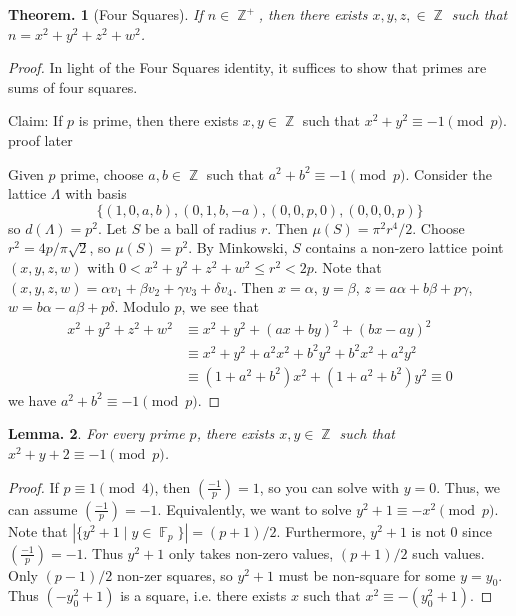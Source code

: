 \documentclass[11pt, a4paper]{memoir}
\DeclareMathOperator{\Z}{{\mathbb{Z}}}
\DeclareMathOperator{\F}{{\mathbb{F}}}
\theoremstyle{change}
\newtheorem{theorem}{Theorem.}[section]
\newtheorem{lemma}[theorem]{Lemma.}
\theoremstyle{plain}
\theoremstyle{nonumberplain}
\newtheorem{proof}{Proof}
\newcommand{\lgs}[2]{\ensuremath{\left(\frac{#1}{#2}\right)}}
\numberwithin{equation}{section}
\begin{document}
\begin{theorem}[Four Squares]
    If $n\in\Z^+$, then there exists $x,y,z,\in\Z$ such that $n=x^2+y^2+z^2+w^2$.
\end{theorem}
\begin{proof}
    In light of the Four Squares identity, it suffices to show that primes are sums of four squares.

    Claim: If $p$ is prime, then there exists $x,y\in\Z$ such that $x^2+y^2\equiv -1\pmod{p}$.
    proof later

    Given $p$ prime, choose $a,b\in\Z$ such that $a^2+b^2\equiv -1\pmod{p}$.
    Consider the lattice $\Lambda$ with basis
    \begin{equation*}
        \{(1,0,a,b),(0,1,b,-a),(0,0,p,0),(0,0,0,p)\}
    \end{equation*}
    so $d(\Lambda)=p^2$.
    Let $S$ be a ball of radius $r$.
    Then $\mu(S)=\pi^2r^4/2$.
    Choose $r^2=4p/\pi\sqrt{2}$, so $\mu(S)=p^2$.
    By Minkowski, $S$ contains a non-zero lattice point $(x,y,z,w)$ with $0<x^2+y^2+z^2+w^2\leq r^2<2p$.
    Note that $(x,y,z,w)=\alpha v_1+\beta v_2+\gamma v_3+\delta v_4$.
    Then $x=\alpha$, $y=\beta$, $z=a\alpha+b\beta+p\gamma$, $w=b\alpha-a\beta+p\delta$.
    Modulo $p$, we see that
    \begin{align*}
        x^2+y^2+z^2+w^2 &\equiv x^2+y^2+(ax+by)^2+(bx-ay)^2\\
                        &\equiv x^2+y^2+a^2x^2+b^2y^2+b^2x^2+a^2y^2\\
                        &\equiv (1+a^2+b^2)x^2+(1+a^2+b^2)y^2\equiv 0
    \end{align*}
    we have $a^2+b^2\equiv -1\pmod{p}$.
\end{proof}
\begin{lemma}
    For every prime $p$, there exists $x,y\in\Z$ such that $x^2+y+2\equiv -1\pmod{p}$.
\end{lemma}
\begin{proof}
    If $p\equiv 1\pmod{4}$, then $\lgs{-1}{p}=1$, so you can solve with $y=0$.
    Thus, we can assume $\lgs{-1}{p}=-1$.
    Equivalently, we want to solve $y^2+1\equiv -x^2\pmod{p}$.
    Note that $|\{y^2+1\mid y\in\F_p\}|=(p+1)/2$.
    Furthermore, $y^2+1$ is not $0$ since $\lgs{-1}{p}=-1$.
    Thus $y^2+1$ only takes non-zero values, $(p+1)/2$ such values.
    Only $(p-1)/2$ non-zer squares, so $y^2+1$ must be non-square for some $y=y_0$.
    Thus $(-y_0^2+1)$ is a square, i.e. there exists $x$ such that $x^2\equiv-(y_0^2+1)$.
\end{proof}
\end{document}
